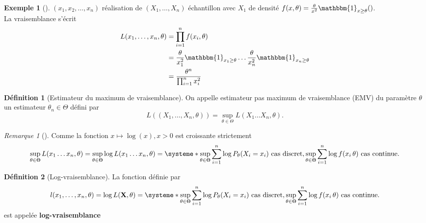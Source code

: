 \documentclass{article}
\theoremstyle{plain}%
\theoremstyle{definition}
\newtheorem{defn}{Définition}[section]
\newtheorem{exmp}{Exemple}[section]
\theoremstyle{remark}
\newtheorem*{rem}{Remarque}
\begin{document}
\begin{exmp}[]
    $ (x_1,x_2,\dots,x_n) $ réalisation de $(X_1,\dots, X_n)$ échantillon avec $ X_1 $ de densité $ f(x, \theta ) = \frac{\theta }{x^2}\mathbbm{1}_{x \geq \theta }() $. \\
    La vraisemblance s'écrit \begin{align*}
        L(x_1, \dots, x_n, \theta ) &= \prod_{i=1}^{n}f(x_i, \theta ) \\
        &= \frac{\theta }{x_1^2}\mathbbm{1}_{x_1 \geq \theta } \dots \frac{\theta }{x_n^2}\mathbbm{1}_{x_n \geq \theta } \\
        &= \frac{\theta ^n}{\prod_{i=1}^{n}x_i^2}
    \end{align*}
\end{exmp}

\begin{defn}[Estimateur du maximum de vraisemblance]
    On appelle estimateur pas maximum de vraisemblance (EMV) du paramètre $ \theta  $ un estimateur $ \theta _n \in \Theta $ défini par 
    \[
        L((X_1,\dots,X_n, \theta )) = \sup_{\theta \in \Theta } L(X_1 \dots X_n, \theta)
    .\]    
\end{defn}
\begin{rem}[]
    Comme la fonction $ x \mapsto \log(x), x>0 $ est croissante strictement 
    \[
        \sup _{\theta \in \Theta } L(x_1 \dots x_n, \theta ) = \sup_{\theta \in \Theta } \log L(x_1 \dots x_n, \theta ) = \systeme*{
            \sup_{\theta \in \Theta } \sum_{i=1}^{n}\log P_\theta (X_i=x_i) \text{ cas discret},
            \sup_{\theta \in \Theta } \sum_{i=1}^{n}\log f(x_i\, \theta ) \text{ cas continue}
        }
    .\]
\end{rem}
\begin{defn}[Log-vraisemblance]
    La fonction définie par 
    \[
        l(x_1, \dots, x_n, \theta ) = \log L(\mathbf{X}, \theta ) = \systeme*{
            \sup_{\theta \in \Theta } \sum_{i=1}^{n}\log P_\theta (X_i=x_i) \text{ cas discret},
            \sup_{\theta \in \Theta } \sum_{i=1}^{n}\log f(x_i\, \theta ) \text{ cas continue}
        }
    .\]
    est appelée \textbf{log-vraisemblance}
\end{defn}
\end{document}
